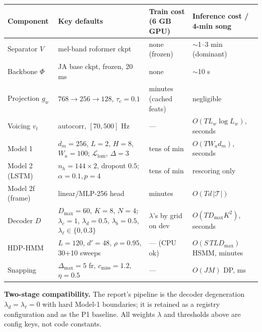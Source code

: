\documentclass[10pt]{article}
\newcommand{\Tok}{\mathcal{T}}
\begin{document}
\begin{center}
\small
\begin{tabular}{@{}llll@{}}
\toprule
Component & Key defaults & Train cost (6 GB GPU) & Inference cost / 4-min song \\
\midrule
Separator $V$ & mel-band roformer ckpt & none (frozen) & $\sim$1--3 min (dominant) \\
Backbone $\Phi$ & JA base ckpt, frozen, 20 ms & none & $\sim$10 s \\
Projection $g_w$ & $768{\to}256{\to}128$, $\tau_c{=}0.1$ & minutes (cached feats) & negligible \\
Voicing $v_t$ & autocorr, $[70,500]$ Hz & --- & $O(T L_w \log L_w)$, seconds \\
Model 1 & $d_m{=}256$, $L{=}2$, $H{=}8$, $W_a{=}100$; $\mathcal{L}_{\mathrm{lom}}$, $\Delta{=}3$ & tens of min & $O(T W_a d_m)$, seconds \\
Model 2 (LSTM) & $n_h{=}144\times2$, dropout $0.5$; $\alpha{=}0.1, p{=}4$ & tens of min & rescoring only \\
Model 2f (frame) & linear/MLP-256 head & minutes & $O(T d\,|\Tok|)$ \\
Decoder $D$ & $D_{\max}{=}60$, $K{=}8$, $N{=}4$; $\lambda_c{=}1$, $\lambda_d{=}0.5$, $\lambda_b{=}0.5$, $\lambda_\ell{\in}\{0, 0.3\}$ & $\lambda$'s by grid on dev & $O(T D_{\max} K^2)$, seconds \\
HDP-HMM & $L{=}120$, $d'{=}48$, $\rho{=}0.95$, 30+10 sweeps & --- (CPU ok) & $O(S\,T L D_{\max})$ HSMM, minutes \\
Snapping & $\Delta_{\max}{=}5$ fr, $c_{\mathrm{miss}}{=}1.2$, $\eta{=}0.5$ & --- & $O(JM)$ DP, ms \\
\bottomrule
\end{tabular}
\end{center}

\vspace{0.5em}
\noindent\textbf{Two-stage compatibility.} The report's pipeline is the decoder degeneration $\lambda_d = \lambda_\ell = 0$ with hard Model-1 boundaries; it is retained as a registry configuration and as the P1 baseline. All weights $\lambda$ and thresholds above are config keys, not code constants.
\end{document}
